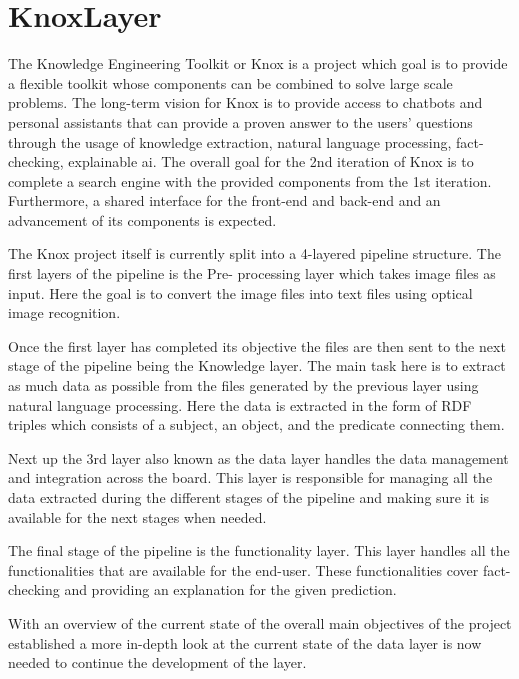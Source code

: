 \section{KnoxLayer}
The Knowledge Engineering Toolkit or Knox is a project which goal is to provide a flexible toolkit whose components can be combined 
to solve large scale problems. The long-term vision for Knox is to provide access to chatbots and personal assistants that can  
provide a proven answer to the users' questions through the usage of knowledge extraction, natural language processing, fact- 
checking, explainable ai. 
The overall goal for the 2nd iteration of Knox is to complete a search engine with the provided components from the 1st iteration. 
Furthermore, a shared interface for the front-end and back-end and an advancement of its components is expected. 


The Knox project itself is currently split into a 4-layered pipeline structure. The first layers of the pipeline is the Pre-
processing layer which takes image files as input. Here the goal is to convert the image files into text files using optical image 
recognition. 


Once the first layer has completed its objective the files are then sent to the next stage of the pipeline being the Knowledge 
layer. The main task here is to extract as much data as possible from the files generated by the previous layer using natural 
language processing. Here the data is extracted in the form of RDF triples which consists of a subject, an object, and the predicate 
connecting them. 


Next up the 3rd layer also known as the data layer handles the data management and integration across the board. This layer is 
responsible for managing all the data extracted during the different stages of the pipeline and making sure it is available for the 
next stages when needed. 


The final stage of the pipeline is the functionality layer. This layer handles all the functionalities that are available for the 
end-user. These functionalities cover fact-checking and providing an explanation for the given prediction.


With an overview of the current state of the overall main objectives of the project  established a more in-depth look at the current 
state of the data layer is now needed to continue the development of the layer. 

